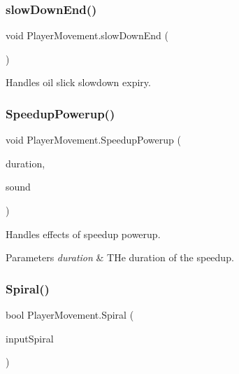 \subsubsection{\texorpdfstring{slow\+Down\+End()}{slowDownEnd()}}
{\footnotesize\ttfamily void Player\+Movement.\+slow\+Down\+End (\begin{DoxyParamCaption}{ }\end{DoxyParamCaption})}



Handles oil slick slowdown expiry. 

\mbox{\label{class_player_movement_a9d75c39b5e4ee0c5d999bdfdc4d1db73}} 
\subsubsection{\texorpdfstring{Speedup\+Powerup()}{SpeedupPowerup()}}
{\footnotesize\ttfamily void Player\+Movement.\+Speedup\+Powerup (\begin{DoxyParamCaption}\item[{float}]{duration,  }\item[{Audio\+Clip}]{sound }\end{DoxyParamCaption})}



Handles effects of speedup powerup. 
\begin{DoxyParams}{Parameters}
{\em duration} & T\+He duration of the speedup.\\
\hline
\end{DoxyParams}


\mbox{\label{class_player_movement_a02c0e10fc29c38c92c6196d70364ac89}} 
\subsubsection{\texorpdfstring{Spiral()}{Spiral()}}
{\footnotesize\ttfamily bool Player\+Movement.\+Spiral (\begin{DoxyParamCaption}\item[{float}]{input\+Spiral }\end{DoxyParamCaption})}



